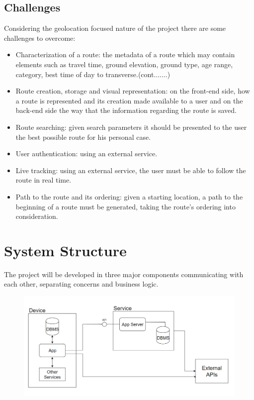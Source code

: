 \documentclass{article}
\begin{document}
        \subsection{Challenges}
            
            Considering the geolocation focused nature of the project there are some challenges to overcome:

            \begin{itemize}
                \item Characterization of a route: the metadata of a route which may contain elements such as travel time, ground elevation, ground type, age range, category, best time of day to transverse.(cont.......) 
                \item Route creation, storage and visual representation: on the front-end side, how a route is represented and its creation made available to a user and on the back-end side the way that the information regarding the route is saved.
                \item Route searching: given search parameters it should be presented to the user the best possible route for his personal case.  
                \item User authentication: using an external service.
                \item Live tracking: using an external service, the user must be able to follow the route in real time.
                \item Path to the route and its ordering: given a starting location, a path to the beginning of a route must be generated, taking the route's ordering into consideration.
            \end{itemize}

    \section{System Structure}
        The project will be developed in three major components communicating with each other, separating concerns and business logic.
        
        \begin{figure}[h]            
            \includegraphics[width=\textwidth]{images/project-structure/system-structure.PNG}
        \end{figure}  
\end{document}
